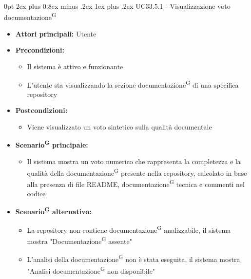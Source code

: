 \documentclass[a4paper, 11pt]{article}
\makeatletter
\renewcommand\subparagraph{\@startsection{subparagraph}{5}
  {0pt}
  {2ex plus 0.8ex minus .2ex}
  {1ex plus .2ex}
  {\normalfont\normalsize\bfseries\color{AccentColor}}}
\makeatother
\begin{document}
\subparagraph{UC33.5.1 - Visualizzazione voto documentazione\textsuperscript{G}}\label{UC33.5.1}
\begin{itemize}
    \item \textbf{Attori principali:} Utente
    \item \textbf{Precondizioni:}
    \begin{itemize}
        \item Il sistema è attivo e funzionante
        \item L'utente sta visualizzando la sezione documentazione\textsuperscript{G} di una specifica repository
    \end{itemize}
    \item \textbf{Postcondizioni:}
    \begin{itemize}
        \item Viene visualizzato un voto sintetico sulla qualità documentale
    \end{itemize}
    \item \textbf{Scenario\textsuperscript{G} principale:}
    \begin{itemize}
        \item Il sistema mostra un voto numerico che rappresenta la completezza e la qualità della documentazione\textsuperscript{G} presente nella repository, calcolato in base alla presenza di file README, documentazione\textsuperscript{G} tecnica e commenti nel codice
    \end{itemize}
    \item \textbf{Scenario\textsuperscript{G} alternativo:}
    \begin{itemize}
        \item La repository non contiene documentazione\textsuperscript{G} analizzabile, il sistema mostra "Documentazione\textsuperscript{G} assente"
        \item L'analisi della documentazione\textsuperscript{G} non è stata eseguita, il sistema mostra "Analisi documentazione\textsuperscript{G} non disponibile"
    \end{itemize}
\end{itemize}
\end{document}
